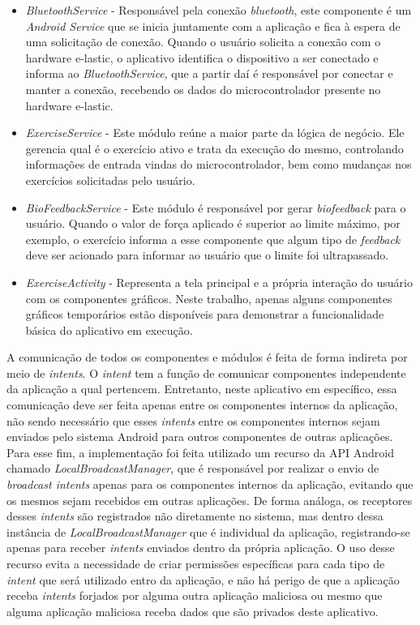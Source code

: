 \begin{itemize}
	\item \textit{BluetoothService} - Responsável pela conexão \textit{bluetooth}, este componente é um \textit{Android Service} que se inicia juntamente com a aplicação e fica à espera de uma solicitação de conexão. Quando o usuário solicita a conexão com o hardware e-lastic, o aplicativo identifica o dispositivo a ser conectado e informa ao \textit{BluetoothService}, que a partir daí é responsável por conectar e manter a conexão, recebendo os dados do microcontrolador presente no hardware e-lastic.
	\item \textit{ExerciseService} - Este módulo reúne a maior parte da lógica de negócio. Ele gerencia qual é o exercício ativo e trata da execução do mesmo, controlando informações de entrada vindas do microcontrolador, bem como mudanças nos exercícios solicitadas pelo usuário.
	\item \textit{BioFeedbackService} - Este módulo é responsável por gerar \textit{biofeedback} para o usuário. Quando o valor de força aplicado é superior ao limite máximo, por exemplo, o exercício informa a esse componente que algum tipo de \textit{feedback} deve ser acionado para informar ao usuário que o limite foi ultrapassado.
	\item \textit{ExerciseActivity} - Representa a tela principal e a própria interação do usuário com os componentes gráficos. Neste trabalho, apenas alguns componentes gráficos temporários estão disponíveis para demonstrar a funcionalidade básica do aplicativo em execução.
\end{itemize} 

A comunicação de todos os componentes e módulos é feita de forma indireta por meio de \textit{intents}. O \textit{intent} tem a função de comunicar componentes independente da aplicação a qual pertencem. Entretanto, neste aplicativo em específico, essa comunicação deve ser feita apenas entre os componentes internos da aplicação, não sendo necessário que esses \textit{intents} entre os componentes internos sejam enviados pelo sistema Android para outros componentes de outras aplicações. Para esse fim, a implementação foi feita utilizado um recurso da API Android chamado \textit{LocalBroadcastManager}, que é responsável por realizar o envio de \textit{broadcast intents} apenas para os componentes internos da aplicação, evitando que os mesmos sejam recebidos em outras aplicações. De forma análoga, os receptores desses \textit{intents} são registrados não diretamente no sistema, mas dentro dessa instância de \textit{LocalBroadcastManager} que é individual da aplicação, registrando-se apenas para receber \textit{intents} enviados dentro da própria aplicação. O uso desse recurso evita a necessidade de criar permissões específicas para cada tipo de \textit{intent} que será utilizado entro da aplicação, e não há perigo de que a aplicação receba \textit{intents} forjados por alguma outra aplicação maliciosa ou mesmo que alguma aplicação maliciosa receba dados que são privados deste aplicativo.

